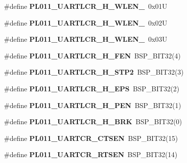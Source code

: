 \begin{DoxyCompactItemize}
\#define {\bfseries P\+L011\+\_\+\+U\+A\+R\+T\+L\+C\+R\+\_\+\+H\+\_\+\+W\+L\+E\+N\+\_}~0x01U
\item 
\mbox{\label{arm-pl011-regs_8h_abbd6b36cd0957b733b8a4b940b320e64}} 
\#define {\bfseries P\+L011\+\_\+\+U\+A\+R\+T\+L\+C\+R\+\_\+\+H\+\_\+\+W\+L\+E\+N\+\_}~0x02U
\item 
\mbox{\label{arm-pl011-regs_8h_af4b5f572c49685fec05348c57fbcbfb1}} 
\#define {\bfseries P\+L011\+\_\+\+U\+A\+R\+T\+L\+C\+R\+\_\+\+H\+\_\+\+W\+L\+E\+N\+\_}~0x03U
\item 
\mbox{\label{arm-pl011-regs_8h_a48080e96c840431ba4bfb02d0d23fdbc}} 
\#define {\bfseries P\+L011\+\_\+\+U\+A\+R\+T\+L\+C\+R\+\_\+\+H\+\_\+\+F\+EN}~B\+S\+P\+\_\+\+B\+I\+T32(4)
\item 
\mbox{\label{arm-pl011-regs_8h_a69ad02c8f117dba096547c93844679f1}} 
\#define {\bfseries P\+L011\+\_\+\+U\+A\+R\+T\+L\+C\+R\+\_\+\+H\+\_\+\+S\+T\+P2}~B\+S\+P\+\_\+\+B\+I\+T32(3)
\item 
\mbox{\label{arm-pl011-regs_8h_a26202d1a69bbb94c15c065d35a0414c7}} 
\#define {\bfseries P\+L011\+\_\+\+U\+A\+R\+T\+L\+C\+R\+\_\+\+H\+\_\+\+E\+PS}~B\+S\+P\+\_\+\+B\+I\+T32(2)
\item 
\mbox{\label{arm-pl011-regs_8h_a47d2c80fedfc093dd0b7593d6acad9f2}} 
\#define {\bfseries P\+L011\+\_\+\+U\+A\+R\+T\+L\+C\+R\+\_\+\+H\+\_\+\+P\+EN}~B\+S\+P\+\_\+\+B\+I\+T32(1)
\item 
\mbox{\label{arm-pl011-regs_8h_acddababdf42c748ce358b6d1209790f5}} 
\#define {\bfseries P\+L011\+\_\+\+U\+A\+R\+T\+L\+C\+R\+\_\+\+H\+\_\+\+B\+RK}~B\+S\+P\+\_\+\+B\+I\+T32(0)
\item 
\mbox{\label{arm-pl011-regs_8h_a62596e8afca250bdb8d6a9146b9798ed}} 
\#define {\bfseries P\+L011\+\_\+\+U\+A\+R\+T\+C\+R\+\_\+\+C\+T\+S\+EN}~B\+S\+P\+\_\+\+B\+I\+T32(15)
\item 
\mbox{\label{arm-pl011-regs_8h_adb674a5c22c4b7bc00af27a9a425b4ab}} 
\#define {\bfseries P\+L011\+\_\+\+U\+A\+R\+T\+C\+R\+\_\+\+R\+T\+S\+EN}~B\+S\+P\+\_\+\+B\+I\+T32(14)

\end{DoxyCompactItemize}
